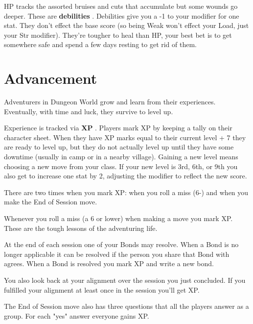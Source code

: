        

HP tracks the assorted bruises and cuts that accumulate but some wounds go deeper. These are {\bf debilities} . Debilities give you a -1 to your modifier for one stat. They don't effect the base score (so being Weak won't effect your Load, just your Str modifier). They're tougher to heal than HP, your best bet is to get somewhere safe and spend a few days resting to get rid of them.

       
\section{Advancement}   
       

Adventurers in Dungeon World grow and learn from their experiences. Eventually, with time and luck, they survive to level up.

       

Experience is tracked via {\bf XP} . Players mark XP by keeping a tally on their character sheet. When they have XP marks equal to their current level + 7 they are ready to level up, but they do not actually level up until they have some downtime (usually in camp or in a nearby village). Gaining a new level means choosing a new move from your class. If your new level is 3rd, 6th, or 9th you also get to increase one stat by 2, adjusting the modifier to reflect the new score.

       

There are two times when you mark XP: when you roll a miss (6-) and when you make the End of Session move.

       

Whenever you roll a miss (a 6 or lower) when making a move you mark XP. These are the tough lessons of the adventuring life.

       

At the end of each session one of your Bonds may resolve. When a Bond is no longer applicable it can be resolved if the person you share that Bond with agrees. When a Bond is resolved you mark XP and write a new bond.

       

You also look back at your alignment over the session you just concluded. If you fulfilled your alignment at least once in the session you'll get XP.

       

The End of Session move also has three questions that all the players answer as a group. For each "yes" answer everyone gains XP.

